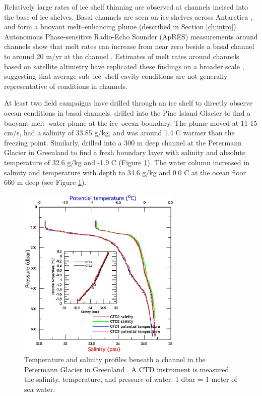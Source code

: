 Relatively large rates of ice shelf thinning are observed at channels incised into the base of ice shelves. Basal channels are seen on ice shelves across Antarctica \citep{alley2016impacts}, and form a buoyant melt--enhancing plume (described in Section \ref{ch:intro}). Autonomous Phase-sensitive Radio-Echo Sounder (ApRES) measurements around channels show that melt rates can increase from near zero beside a basal channel to around 20 m/yr at the channel \citep{stanton2013channelized, marsh2016high}. Estimates of melt rates around channels based on satellite altimetry have replicated these findings on a broader scale \cite[e.g][]{chartrand2020basal,rignot2008channelized},
suggesting that average sub--ice--shelf cavity conditions are not generally representative of conditions in channels. 

At least two field campaigns have drilled through an ice shelf to directly observe ocean conditions in basal channels.
\cite{stanton2013channelized} drilled into the Pine Island Glacier to find a buoyant melt--water plume at the ice--ocean boundary. The plume moved at 11-15 cm/s, had a salinity of 33.85 g/kg, and was around 1.4 \textdegree C warmer than the freezing point. Similarly, \cite{rignot2008channelized} drilled into a 300 m deep channel at the Petermann Glacier in Greenland to find a fresh boundary layer with salinity and absolute temperature of  32.6 g/kg and -1.9 \textdegree C (Figure \ref{fig:oceanobs3}). The water column increased in salinity and temperature with depth to 34.6 g/kg and 0.0 \textdegree C at the ocean floor 660 m deep (see Figure \ref{fig:oceanobs3}).

\begin{figure}[!ht]
\centering
\includegraphics[width=0.7\textwidth]{chapters/4/oceanobs3.png}
\caption[Petermann observations]{Temperature and salinity profiles beneath a channel in the Petermann Glacier in Greenland \cite{rignot2008channelized}. A CTD instrument is measured the salinity, temperature, and pressure of water. 1 dbar = 1 meter of sea water.}
\label{fig:oceanobs3}
\end{figure}

